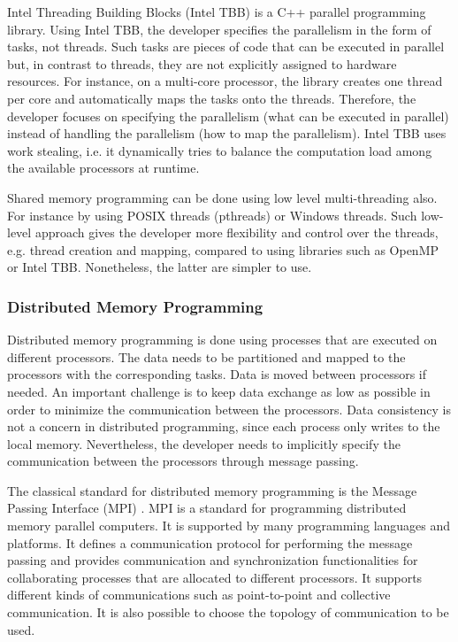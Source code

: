 Intel Threading Building Blocks (Intel TBB) \cite{reinders:2007} is a C++ parallel programming library. Using Intel TBB, the developer specifies the parallelism in the form of tasks, not threads. Such tasks are pieces of code that can be executed in parallel but, in contrast to threads, they are not explicitly assigned to hardware resources. For instance, on a multi-core processor, the library creates one thread per core and automatically maps the tasks onto the threads. Therefore, the developer focuses on specifying the parallelism (what can be executed in parallel) instead of handling the parallelism (how to map the parallelism). Intel TBB uses work stealing, i.e. it dynamically tries to balance the computation load among the available processors at runtime.

Shared memory programming can be done using low level multi-threading also. For instance by using POSIX threads (pthreads) or Windows threads. Such low-level approach gives the developer more flexibility and control over the threads, e.g. thread creation and mapping, compared to using libraries such as OpenMP or Intel TBB. Nonetheless, the latter are simpler to use. 

\subsubsection{Distributed Memory Programming}

Distributed memory programming is done using processes that are executed on different processors. The data needs to be partitioned and mapped to the processors with the corresponding tasks. Data is moved between processors if needed. An important challenge is to keep data exchange as low as possible in order to minimize the communication between the processors. Data consistency is not a concern in distributed programming, since each process only writes to the local memory. Nevertheless, the developer needs to implicitly specify the communication between the processors through message passing.  

The classical standard for distributed memory programming is the Message Passing Interface (MPI) \cite{mpi}. MPI is a standard for programming distributed memory parallel computers. It is supported by many programming languages and platforms. It defines a communication protocol for performing the message passing and provides communication and synchronization functionalities for collaborating processes that are allocated to different processors. It supports different kinds of communications such as point-to-point and collective communication. It is also possible to choose the topology of communication to be used.

